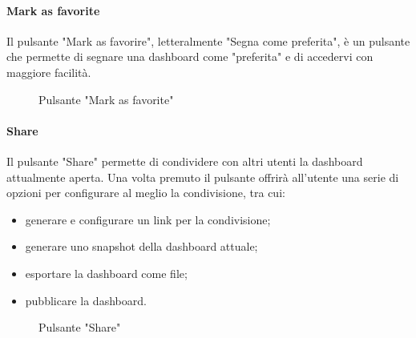 \paragraph{Mark as favorite}
Il pulsante "Mark as favorire", letteralmente "Segna come preferita", è un pulsante che permette di segnare una dashboard come "preferita" e di accedervi con maggiore facilità.
\begin{figure}[H]
    \centering
    \caption{Pulsante "Mark as favorite"}
    \label{fig:my_label}
\end{figure}

\paragraph{Share}
Il pulsante "Share" permette di condividere con altri utenti la dashboard attualmente aperta. Una volta premuto il pulsante offrirà all'utente una serie di opzioni per configurare al meglio la condivisione, tra cui:
\begin{itemize}
    \item generare e configurare un link per la condivisione;
    \item generare uno snapshot della dashboard attuale;
    \item esportare la dashboard come file;
    \item pubblicare la dashboard. 
\end{itemize}
\begin{figure}[H]
    \centering
    \caption{Pulsante "Share"}
    \label{fig:my_label}
\end{figure}


